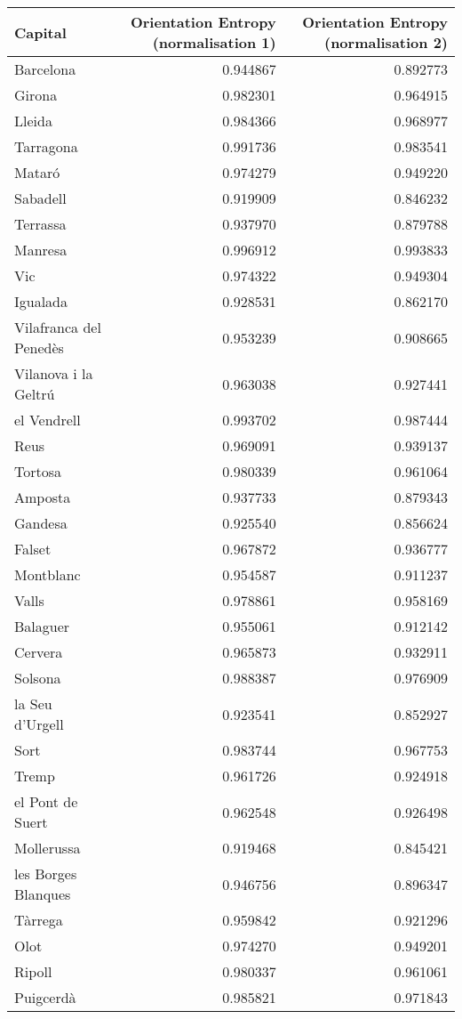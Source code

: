 \begin{tabular}{lrr}
\toprule
Capital & Orientation Entropy (normalisation 1) & Orientation Entropy (normalisation 2) \\
\midrule
Barcelona & 0.944867 & 0.892773 \\
Girona & 0.982301 & 0.964915 \\
Lleida & 0.984366 & 0.968977 \\
Tarragona & 0.991736 & 0.983541 \\
Mataró & 0.974279 & 0.949220 \\
Sabadell & 0.919909 & 0.846232 \\
Terrassa & 0.937970 & 0.879788 \\
Manresa & 0.996912 & 0.993833 \\
Vic & 0.974322 & 0.949304 \\
Igualada & 0.928531 & 0.862170 \\
Vilafranca del Penedès & 0.953239 & 0.908665 \\
Vilanova i la Geltrú & 0.963038 & 0.927441 \\
el Vendrell & 0.993702 & 0.987444 \\
Reus & 0.969091 & 0.939137 \\
Tortosa & 0.980339 & 0.961064 \\
Amposta & 0.937733 & 0.879343 \\
Gandesa & 0.925540 & 0.856624 \\
Falset & 0.967872 & 0.936777 \\
Montblanc & 0.954587 & 0.911237 \\
Valls & 0.978861 & 0.958169 \\
Balaguer & 0.955061 & 0.912142 \\
Cervera & 0.965873 & 0.932911 \\
Solsona & 0.988387 & 0.976909 \\
la Seu d'Urgell & 0.923541 & 0.852927 \\
Sort & 0.983744 & 0.967753 \\
Tremp & 0.961726 & 0.924918 \\
el Pont de Suert & 0.962548 & 0.926498 \\
Mollerussa & 0.919468 & 0.845421 \\
les Borges Blanques & 0.946756 & 0.896347 \\
Tàrrega & 0.959842 & 0.921296 \\
Olot & 0.974270 & 0.949201 \\
Ripoll & 0.980337 & 0.961061 \\
Puigcerdà & 0.985821 & 0.971843 \\

\end{tabular}
